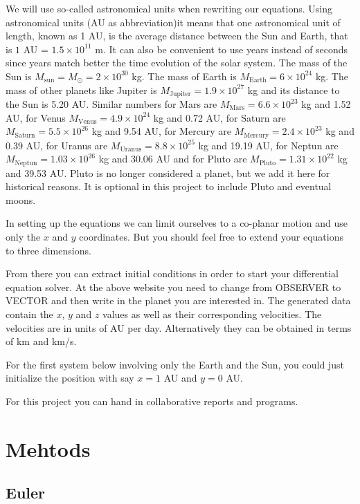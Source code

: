 \documentclass[11pt,a4paper]{article}
\begin{document}
We will use so-called astronomical units when rewriting our equations. 
Using astronomical units (AU as abbreviation)it means that 
one astronomical unit of length, known as 1 AU, is the average distance between the Sun and Earth, that is
$1$ AU = $1.5\times 10^{11}$ m.  It can also be convenient to use years instead of seconds since years match
better the time evolution of the solar system. The mass of the Sun is $M_{\mathrm{sun}}=M_{\odot}=2\times 10^{30}$ kg. The mass of Earth is
$M_{\mathrm{Earth}}=6\times 10^{24}$ kg. The mass of other planets like Jupiter is 
$M_{\mathrm{Jupiter}}=1.9\times 10^{27}$ kg and its distance to the Sun is 5.20 AU. Similar numbers for Mars
are $M_{\mathrm{Mars}}=6.6\times 10^{23}$ kg and  1.52 AU, for Venus $M_{\mathrm{Venus}}=4.9\times 10^{24}$ kg and  0.72 AU, for Saturn are $M_{\mathrm{Saturn}}=5.5\times 10^{26}$ kg and  9.54 AU, for Mercury are $M_{\mathrm{Mercury}}=2.4\times 10^{23}$ kg and  0.39 AU, for Uranus are $M_{\mathrm{Uranus}}=8.8\times 10^{25}$ kg and  19.19 AU, for Neptun are $M_{\mathrm{Neptun}}=1.03\times 10^{26}$ kg and  30.06 AU and for Pluto are $M_{\mathrm{Pluto}}=1.31\times 10^{22}$ kg and  39.53 AU. Pluto is no longer considered  a planet, but we add it here for historical reasons. It is optional in this project to include Pluto and eventual moons. 

In setting up the equations we can limit ourselves to a co-planar motion and use only the $x$ and $y$ coordinates. But you should feel free to extend your equations to three dimensions.

From there you can extract initial conditions in order to start your differential equation solver.
At the above website you need to change from OBSERVER to VECTOR and then write in the planet you are interested in.
The generated data contain the $x$, $y$ and $z$ values as well as their corresponding velocities. The velocities are in units of AU per day.
Alternatively they can be obtained in terms of km and km/s. 

For the first system below involving only the Earth and the Sun, you could just initialize the position with say $x=1$ AU
and $y=0$ AU. 

For this project you can hand in collaborative reports and programs.
\section{Mehtods}
\subsection{Euler}
\end{document}
